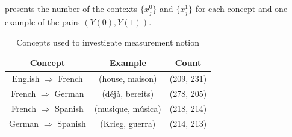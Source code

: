 \documentclass{article}
\theoremstyle{plain}
\theoremstyle{definition}
\theoremstyle{remark}
\begin{document}
 presents the number of the contexts $\{x_j^0\}$ and $\{x_j^1\}$ for each concept and one example of the pairs $(Y(0), Y(1))$.
\begin{table}[t]
\caption{Concepts used to investigate measurement notion}
\label{tbl:measurement_pairs}
\vskip 0.15in
\begin{center}
\begin{small}
\begin{tabular}{ccc}
\toprule
Concept & Example & Count \\
\midrule
English $\Rightarrow$ French & (house, maison) & (209, 231) \\
French $\Rightarrow$ German & (déjà, bereits) & (278, 205) \\
French $\Rightarrow$ Spanish & (musique, música) & (218, 214) \\
German $\Rightarrow$ Spanish & (Krieg, guerra) & (214, 213) \\
\bottomrule
\end{tabular}
\end{small}
\end{center}
\vskip -0.1in
\end{table}
\end{document}

